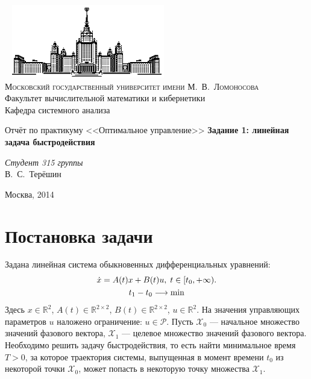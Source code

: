\documentclass[11pt]{article}
\begin{document}
\thispagestyle{empty}

\begin{center}
\ \vspace{-3cm} \newline
\includegraphics[width=0.5\textwidth]{msu.eps}\\
{\scshape Московский государственный университет имени М.~В.~Ломоносова}\\
Факультет вычислительной математики и кибернетики\\
Кафедра системного анализа

\vfill

{\LARGE Отчёт по практикуму <<Оптимальное управление>>} \newline
{\Huge\bfseries Задание 1: линейная задача быстродействия}
\end{center}

\vspace{1cm}
\begin{flushright}
\large
\textit{Студент 315 группы}\\
В.~С.~Терёшин\\
\end{flushright}

\vfill
\begin{center}
Москва, 2014
\end{center}
\pagebreak
\tableofcontents
\pagebreak
\section{Постановка задачи}
Задана линейная система обыкновенных дифференциальных уравнений:
\begin{gather}
\dot{x} = A(t)x + B(t)u, \; t \in [t_0, +\infty). \label{MainEquation} \\
t_1 - t_0 \longrightarrow \min \notag
\end{gather}
Здесь $x \in \mathbb{R}^2$, $A(t) \in \mathbb{R}^{2 \times 2}$, $B(t) \in \mathbb{R}^{2 \times 2}$, $u \in \mathbb{R}^2$. На значения управляющих параметров $u$ наложено ограничение: $u \in \mathcal{P}$. Пусть $\mathcal{X}_0$ --- начальное множество значений фазового вектора, $\mathcal{X}_1$ --- целевое множество значений фазового вектора. Необходимо решить задачу быстродействия, то есть найти минимальное время $T > 0$, за которое траектория системы, выпущенная в момент времени $t_0$ из некоторой точки $\mathcal{X}_0$, может попасть в некоторую точку множества $\mathcal{X}_1$.
\end{document}
